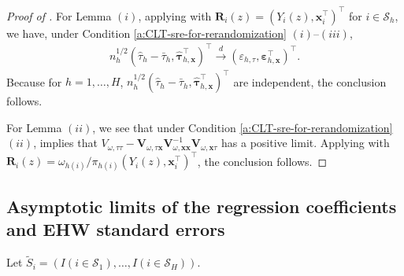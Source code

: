 \documentclass[12pt]{article}
\newtheorem{lemma}{Lemma}
\newcommand{\wconv}{\stackrel{d}{\rightarrow}}
\newcommand{\ms}{\mathcal{S}}
\newcommand{\bs}{\boldsymbol}
\begin{document}
\begin{proof}[Proof of ]
    For Lemma $(i)$, applying  with $\bs{R}_i(z) = (Y_i(z),\bs{x}_i^\top)^\top$ for $i\in \ms_{h}$, we have, under Condition \ref{a:CLT-sre-for-rerandomization} $(i)$--$(iii)$,
 \begin{align*}
     n_h^{1/2}(\hat{\tau}_h-\bar{\tau}_h, \hat{\bs{\tau}}_{h,\bs{x}}^\top)^\top \wconv (\varepsilon_{h,\tau},\bs{\varepsilon}_{h,\bs{x}}^\top)^\top.
  \end{align*}
   Because for $h=1,\ldots,H$,  $n_h^{1/2}(\hat{\tau}_h-\bar{\tau}_h, \hat{\bs{\tau}}_{h,\bs{x}}^\top)^\top$ are independent, the conclusion follows.

   For Lemma $(ii)$, we see that under Condition \ref{a:CLT-sre-for-rerandomization} $(ii)$,  implies that $V_{\omega,\tau\tau} - 
\bs{V}_{\omega,\tau\bs{x}}\bs{V}_{\omega,\bs{x}\bs{x}}^{-1}\bs{V}_{\omega,\bs{x}\tau}$ has a positive limit. 
Applying  with $\bs{R}_i(z)=\omega_{h(i)}/\pi_{h(i)}(Y_i(z),\bs{x}_i^\top)^\top$, the conclusion follows.
\end{proof}



\subsection{Asymptotic limits of the regression coefficients and EHW standard errors}
Let $\tilde{S}_i = (I(i\in \ms_1),\ldots, I(i\in \ms_H))$.
 
\end{document}
